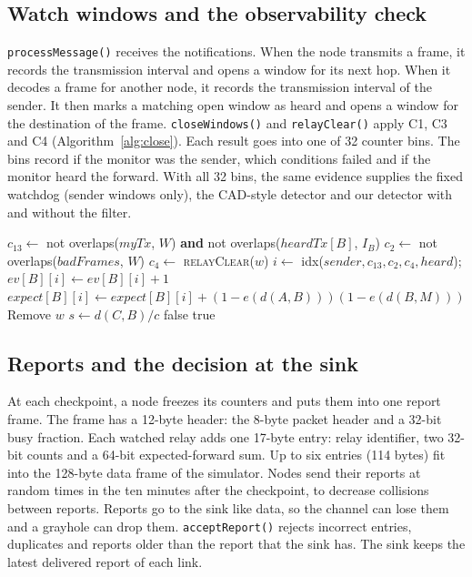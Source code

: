 \documentclass[11pt]{article}
\begin{document}
\subsection{Watch windows and the observability check}\label{sec:impl-windows}
\noindent
\texttt{processMessage()} receives the notifications.
When the node transmits a frame, it records the transmission interval and opens a window for its next hop.
When it decodes a frame for another node, it records the transmission interval of the sender.
It then marks a matching open window as heard and opens a window for the destination of the frame.
\texttt{closeWindows()} and \texttt{relayClear()} apply C1, C3 and C4 (Algorithm~\ref{alg:close}).
Each result goes into one of 32 counter bins.
The bins record if the monitor was the sender, which conditions failed and if the monitor heard the forward.
With all 32 bins, the same evidence supplies the fixed watchdog (sender windows only), the CAD-style detector and our detector with and without the filter.

\begin{algorithm}[htbp]
\small
\caption{\texttt{closeWindows()} and \texttt{relayClear()} in \texttt{MonitorNode}}\label{alg:close}
\begin{algorithmic}[1]
    \State $c_{13} \gets$ not overlaps($\mathit{myTx}$, $W$) \textbf{and} not overlaps($\mathit{heardTx}[B]$, $I_B$)
    \State $c_2 \gets$ not overlaps($\mathit{badFrames}$, $W$) 
    \State $c_4 \gets$ \textsc{relayClear}($w$)
    \State $i \gets$ idx($\mathit{sender}, c_{13}, c_2, c_4, \mathit{heard}$); \; $\mathit{ev}[B][i] \gets \mathit{ev}[B][i] + 1$
    \State $\mathit{expect}[B][i] \gets \mathit{expect}[B][i] + (1-e(d(A,B)))(1-e(d(B,M)))$
    \State Remove $w$
  \EndFor
\EndFunction
{}
    \State $s \gets d(C,B)/c$
     \State \Return false \EndIf
  \EndFor
  \State \Return true
\EndFunction
\end{algorithmic}
\end{algorithm}

\subsection{Reports and the decision at the sink}\label{sec:impl-reports}
\noindent
At each checkpoint, a node freezes its counters and puts them into one report frame.
The frame has a 12-byte header: the 8-byte packet header and a 32-bit busy fraction.
Each watched relay adds one 17-byte entry: relay identifier, two 32-bit counts and a 64-bit expected-forward sum.
Up to six entries (114 bytes) fit into the 128-byte data frame of the simulator.
Nodes send their reports at random times in the ten minutes after the checkpoint, to decrease collisions between reports.
Reports go to the sink like data, so the channel can lose them and a grayhole can drop them.
\texttt{acceptReport()} rejects incorrect entries, duplicates and reports older than the report that the sink has.
The sink keeps the latest delivered report of each link.
\end{document}
